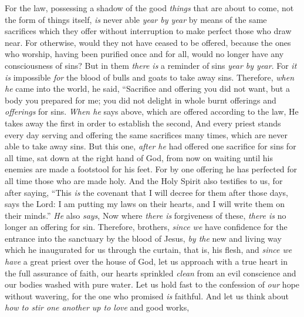 \begin{biblechapter} %
 For the law, possessing a shadow of the good \textit{things} that are about to come, not the form of things itself, \textit{is} never able \textit{year by year} by means of the same sacrifices which they offer without interruption to make perfect those who draw near.
\verse For otherwise, would they not have ceased to be offered, because the ones who worship, having been purified once and for all, would no longer have any consciousness of sins?
\verse But in them \textit{there is} a reminder of sins \textit{year by year}.
\verse For \textit{it is} impossible \textit{for} the blood of bulls and goats to take away sins.
\verse Therefore, \textit{when he} came into the world, he said,
\verse “Sacrifice and offering you did not want, 
but a body you prepared for me;
\verse you did not delight in whole burnt offerings and \textit{offerings} for sins.
\verse \textit{When he} says above,
\verse which are offered according to the law,
\verse He takes away the first in order to establish the second,
\verse And every priest stands every day serving and offering the same sacrifices many times, which are never able to take away sins.
\verse But this one, \textit{after he} had offered one sacrifice for sins for all time, sat down at the right hand of God,
\verse from now on waiting until his enemies are made a footstool for his feet.
\verse For by one offering he has perfected for all time those who are made holy.
\verse And the Holy Spirit also testifies to us, for after saying,
\verse “This \textit{is} the covenant that I will decree for them 
after those days, says the Lord: 
I am putting my laws on their hearts, 
and I will write them on their minds.”
\verse \textit{He} also \textit{says},
\verse Now where \textit{there is} forgiveness of these, \textit{there is} no longer an offering for sin.
 Therefore, brothers, \textit{since we} have confidence for the entrance into the sanctuary by the blood of Jesus,
\verse \textit{by the} new and living way which he inaugurated for us through the curtain, that is, his flesh,
\verse and \textit{since we have} a great priest over the house of God,
\verse let us approach with a true heart in the full assurance of faith, our hearts sprinkled \textit{clean} from an evil conscience and our bodies washed with pure water.
\verse Let us hold fast to the confession of \textit{our} hope without wavering, for the one who promised \textit{is} faithful.
\verse And let us think about \textit{how to stir one another up to love} and good works,

\end{biblechapter}
